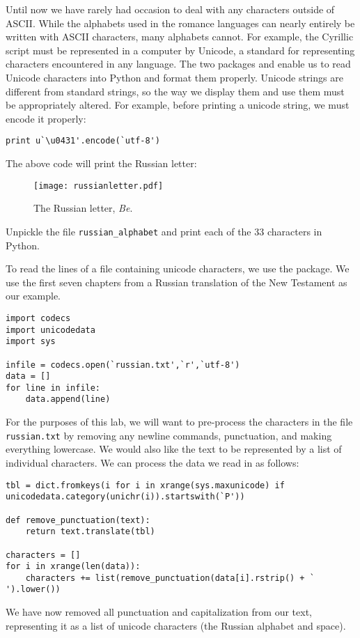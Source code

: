 
Until now we have rarely had occasion to deal with any characters outside of ASCII. While the alphabets used in the romance languages can nearly entirely be written with ASCII characters, many alphabets cannot. For example, the Cyrillic script must be represented in a computer by Unicode, a standard for representing characters encountered in any language. The two packages  and  enable us to read Unicode characters into Python and format them properly.
Unicode strings are different from standard strings, so the way we display them and use them must be appropriately altered. For example, before printing a unicode string, we must encode it properly:
\begin{lstlisting}
print u`\u0431'.encode(`utf-8')
\end{lstlisting}
The above code will print the Russian letter:
\begin{figure}[h]
\centering
\texttt{[image: russianletter.pdf]}
\caption{The Russian letter, \emph{Be}.}
\end{figure}

\begin{problem}
Unpickle the file \texttt{russian\_alphabet} and print each of the 33 characters in Python.
\end{problem}

To read the lines of a file containing unicode characters, we use the  package. We use the first seven chapters from a Russian translation of the New Testament as our example.
\begin{lstlisting}
import codecs
import unicodedata
import sys

infile = codecs.open(`russian.txt',`r',`utf-8')
data = []
for line in infile:
	data.append(line)
\end{lstlisting}
For the purposes of this lab, we will want to pre-process the characters in the file \texttt{russian.txt} by removing any newline commands, punctuation, and making everything lowercase. We would also like the text to be represented by a list of individual characters. We can process the data we read in as follows:
\begin{lstlisting}
tbl = dict.fromkeys(i for i in xrange(sys.maxunicode) if unicodedata.category(unichr(i)).startswith(`P'))

def remove_punctuation(text):
	return text.translate(tbl)

characters = []
for i in xrange(len(data)):
	characters += list(remove_punctuation(data[i].rstrip() + ` ').lower())
\end{lstlisting}
We have now removed all punctuation and capitalization from our text, representing it as a list of unicode characters (the Russian alphabet and space).

